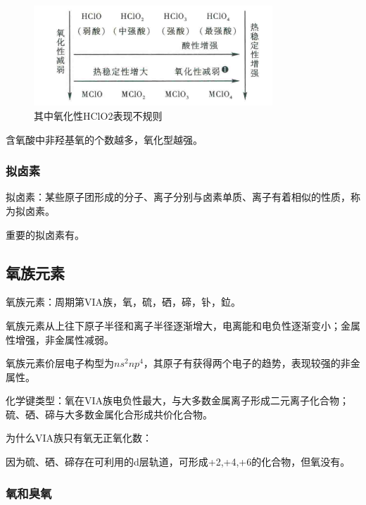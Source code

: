 \documentclass[a4paper,UTF8]{article}
\begin{document}
\begin{figure}[htpb]
	\centering
	\includegraphics[width=0.8\textwidth]{figure//变化规律.png}
	\caption{其中氧化性HClO2表现不规则}
	\label{fig:}
\end{figure}

\begin{tcolorbox}

	含氧酸中非羟基氧的个数越多，氧化型越强。

\end{tcolorbox}

\subsubsection{拟卤素}

拟卤素：某些原子团形成的分子、离子分别与卤素单质、离子有着相似的性质，称为拟卤素。

重要的拟卤素有。

\subsection{氧族元素}

氧族元素：周期第VIA族，氧，硫，硒，碲，钋，鉝。

氧族元素从上往下原子半径和离子半径逐渐增大，电离能和电负性逐渐变小；金属性增强，非金属性减弱。

氧族元素价层电子构型为$ns^2np^4$，其原子有获得两个电子的趋势，表现较强的非金属性。

化学键类型：氧在VIA族电负性最大，与大多数金属离子形成二元离子化合物；硫、硒、碲与大多数金属化合形成共价化合物。

\begin{tcolorbox}

	为什么VIA族只有氧无正氧化数：

	因为硫、硒、碲存在可利用的d层轨道，可形成+2,+4,+6的化合物，但氧没有。

\end{tcolorbox}

\subsubsection{氧和臭氧}
\end{document}
